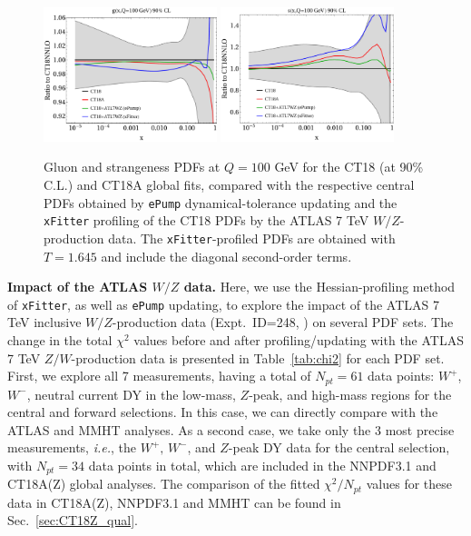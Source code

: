 \begin{figure}
\includegraphics[width=0.45\textwidth]{fig/xFitter/CT18_ATL7WZ_xFitter_ePump_gluon_100GeV_2nd.pdf}
\includegraphics[width=0.45\textwidth]{fig/xFitter/CT18_ATL7WZ_xFitter_ePump_strange_100eV_2nd.pdf}
\caption{Gluon and strangeness PDFs at $Q=100$ GeV  for the CT18 (at 90\% C.L.) and CT18A global fits, compared with the respective central PDFs obtained by \texttt{ePump} dynamical-tolerance updating and the \texttt{xFitter} profiling of the CT18 PDFs by the ATLAS 7 TeV $W/Z$-production data. 
The \texttt{xFitter}-profiled PDFs are obtained with $T=1.645$ and include the diagonal second-order terms.
    }\label{fig:epxf-strange}
\end{figure}

{\bf Impact of the ATLAS $W/Z$ data.}
Here, we use the Hessian-profiling method of \texttt{xFitter}, as well as \texttt{ePump} updating, to explore the impact of the ATLAS 7 TeV inclusive $W/Z$-production data (Expt.~ID=248, \cite{Aaboud:2016btc})
on several PDF sets. The change in the total $\chi^{2}$ values before and after profiling/updating with the ATLAS 7 TeV $Z/W$-production data
is presented in Table~\ref{tab:chi2} for each PDF set. 
First, we explore all 7 measurements, having a total of $N_\textit{pt}=61$ data points: $W^{+}$, $W^{-}$, neutral current DY in the low-mass, $Z$-peak, and high-mass regions
for the central and forward selections. In this case, we can directly compare with the ATLAS \cite{Aaboud:2016btc} and MMHT \cite{Thorne:2019mpt} analyses. 
As a second case, we take only the 3 most precise measurements, {\it i.e.}, the $W^{+},\, W^{-}$, and $Z$-peak DY data for the central selection, with $N_{\textit{pt}}=34$ data points in total,
which are included in the NNPDF3.1 \cite{Ball:2017nwa} and CT18A(Z) global analyses. The comparison of the fitted $\chi^2/N_{\textit{pt}}$ values for these data in CT18A(Z), NNPDF3.1 and
MMHT can be found in Sec.~\ref{sec:CT18Z_qual}.

